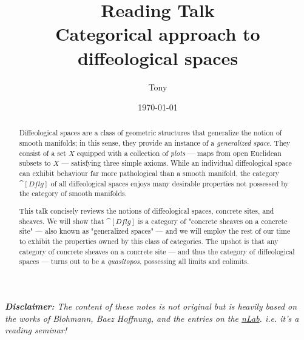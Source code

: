 \documentclass[a4paper,11pt]{article}  %
\title{Reading Talk \\ Categorical approach to diffeological spaces}
\author{Tony}
\date{\today}
\newcommand{\Dflg}{\cat[Dflg]}
\begin{document}

\maketitle
 
\begin{mdframed}[middlelinecolor=red,
middlelinewidth=2pt,
backgroundcolor=red!10,
roundcorner=10pt]
	\textit{\textbf{Disclaimer:} The content of these notes is not original but is heavily based on the works of Blohmann\cite{Blohmann24}, Baez Hoffnung\cite{Baez2011}, and the entries on the \href{https://ncatlab.org/}{\textit{nLab}}. i.e. it's a reading seminar!}
\end{mdframed}



\begin{abstract}
Diffeological spaces are a class of geometric structures that generalize the notion of smooth manifolds; in this sense, they provide an instance of a \emph{generalized space}. They consist of a set $X$ equipped with a collection of \emph{plots} — maps from open Euclidean subsets to $X$ — satisfying three simple axioms. 
While an individual diffeological space can exhibit behaviour far more pathological than a smooth manifold, the category $\Dflg$ of all diffeological spaces enjoys many desirable properties not possessed by the category of smooth manifolds. 

This talk concisely reviews the notions of diffeological spaces, concrete sites, and sheaves. 
We will show that $\Dflg$ is a category of "concrete sheaves on a concrete site" — also known as "generalized spaces" — and we will employ the rest of our time to exhibit the properties owned by this class of categories. 
The upshot is that any category of concrete sheaves on a concrete site — and thus the category of diffeological spaces — turns out to be a \emph{quasitopos}, possessing all limits and colimits.
\end{abstract}
\end{document}
